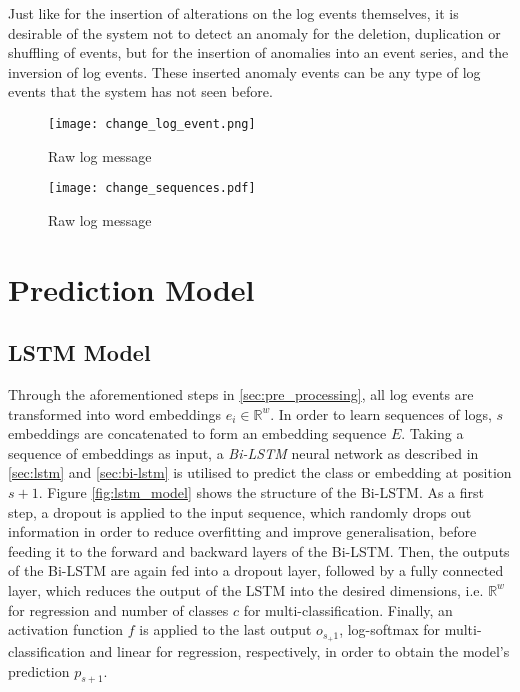 Just like for the insertion of alterations on the log events themselves, it is desirable of the system not to detect an anomaly for the deletion, duplication or shuffling of events, but for the insertion of anomalies into an event series, and the inversion of log events. These inserted anomaly events can be any type of log events that the system has not seen before.


\begin{figure}[H]
	\centering
	\texttt{[image: change\_log\_event.png]}
	\caption{Raw log message}
	\label{fig:changelogevent}
\end{figure}

\begin{figure}[H]
	\centering
	\texttt{[image: change\_sequences.pdf]}
	\caption{Raw log message}
	\label{fig:changesequence}
\end{figure}




\section{Prediction Model\label{sec:prediction_model}}

\subsection{LSTM Model\label{sec:lstm-model}}
Through the aforementioned steps in \ref{sec:pre_processing}, all log events are transformed into word embeddings $e_i \in \mathbb{R}^w$. In order to learn sequences of logs, $s$ embeddings are concatenated to form an embedding sequence $E$. Taking a sequence of embeddings as input, a \textit{Bi-LSTM} neural network as described in \ref{sec:lstm} and \ref{sec:bi-lstm} is utilised to predict the class or embedding at position $s+1$. Figure \ref{fig:lstm_model} shows the structure of the Bi-LSTM. As a first step, a dropout is applied to the input sequence, which randomly drops out information in order to reduce overfitting and improve generalisation, before feeding it to the forward and backward layers of the Bi-LSTM. Then, the outputs of the Bi-LSTM are again fed into a dropout layer, followed by a fully connected layer, which reduces the output of the LSTM into the desired dimensions, i.e. $\mathbb{R}^w$ for regression and number of classes $c$ for multi-classification. Finally, an activation function $f$ is applied to the last output $o_{s_+1}$, log-softmax for multi-classification and linear for regression, respectively, in order to obtain the model's prediction $p_{s+1}$.


